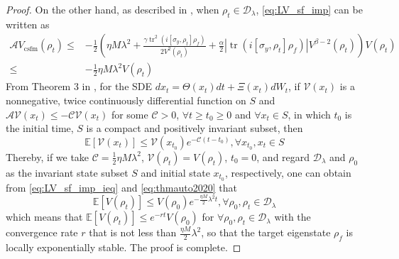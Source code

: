 \documentclass[]{elsarticle}
\begin{document}
\begin{proof}
	On the other hand, as described in \cite{LAMC2018}, when $\rho_{t}\in \mathcal{D}_\lambda$, \eqref{eq:LV_sf_imp} can be written as
	\begin{equation}\label{eq:LV_sf_imp_ieq}
		\begin{aligned}
			\mathcal{A} V_{\mathrm{csfm}}\left(\rho_{t}\right)\le&-\frac{1}{2}\left({\eta M}\lambda^2+\frac{\gamma\operatorname{tr}^2\left(i\left[\sigma_{y}, \rho_{t}\right] {\rho_f}\right)}{2V^2\left(\rho_{t}\right)}+\frac{\alpha}{2}|\operatorname{tr}\left(i\left[\sigma_{y}, \rho_{t}\right] {\rho_f}\right)| V^{\beta-2}\left(\rho_{t}\right)\right)V\left(\rho_{t}\right)\\
			\le&-\frac{1}{2}{\eta M}\lambda^2V\left(\rho_{t}\right)
		\end{aligned}
	\end{equation}
	From Theorem 3 in \cite{CSRJ2020}, for the {} SDE $dx_{t}=\Theta\left(x_{t}\right)dt+\Xi\left(x_{t}\right)dW_t$, if $\mathcal{V}\left(x_t\right)$ is a nonnegative, twice continuously differential function on $S$ and $\mathcal{A}\mathcal{V}\left(x_t\right)\le-\mathcal{C}\mathcal{V}\left(x_{t}\right)$ for some $\mathcal{C}>0$, $\forall t\ge t_0\ge 0$ and $\forall x_t\in S$, in which $t_0$ is the initial time, $S$ is a compact and positively invariant subset, then
	\begin{equation}\label{eq:thmauto2020}
		\mathbb{E}\left[\mathcal{V}\left(x_{t}\right)\right]\le \mathcal{V}\left(x_{t_0}\right)e^{-\mathcal{C}\left(t-t_0\right)}, \forall x_{t_0}, x_{t}\in S
	\end{equation}
	Thereby, if we take $\mathcal{C}=\frac{1}{2}{\eta M}\lambda^2$, $\mathcal{V}(\rho_{t})=V(\rho_{t})$, $t_0=0$,  and regard $\mathcal{D}_\lambda$ and $\rho_{0}$ as the invariant state subset $S$ and initial state $x_{t_0}$, respectively, one can obtain from \eqref{eq:LV_sf_imp_ieq} and \eqref{eq:thmauto2020} that
	\begin{equation}\label{eq:LV_sf_final_1}
		\mathbb{E}\left[V\left(\rho_{t}\right)\right]\leq V\left({\rho}_0\right) e^{-\frac{\eta M}{2}\lambda^{2}t}, \forall \rho_{0}, \rho_{t}\in \mathcal{D}_\lambda
	\end{equation}
	which means that $\mathbb{E}\left[V\left(\rho_{t}\right)\right]\le e^{-r t} V\left(\rho_{0}\right)$ for $\forall \rho_{0}, \rho_{t}\in \mathcal{D}_\lambda$ with the convergence rate $r$ that is not less than $\frac{\eta M}{2}\lambda^{2}$, so that the target eigenstate $\rho_f$ is locally exponentially stable. The proof is complete.
\end{proof}
\end{document}

